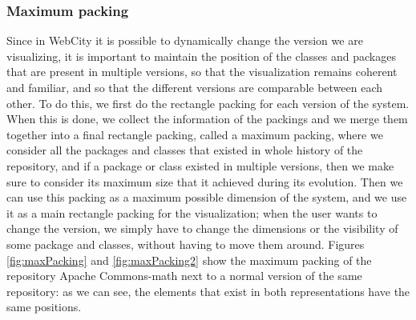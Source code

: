 \documentclass[]{usiinfbachelorproject}
\begin{document}
\subsubsection{Maximum packing} \label{Maximum packing}
Since in WebCity it is possible to dynamically change the version we are visualizing, it is important to maintain the position of the classes and packages that are present in multiple versions, so that the visualization remains coherent and familiar, and so that the different versions are comparable between each other.
To do this, we first do the rectangle packing for each version of the system. When this is done, we collect the information of the packings and we merge them together into a final rectangle packing, called a maximum packing, where we consider all the packages and classes that existed in whole history of the repository, and if a package or class existed in multiple versions, then we make sure to consider its maximum size that it achieved during its evolution.
Then we can use this packing as a maximum possible dimension of the system, and we use it as a main rectangle packing for the visualization; when the user wants to change the version, we simply have to change the dimensions or the visibility of some package and classes, without having to move them around.
Figures \ref{fig:maxPacking} and \ref{fig:maxPacking2} show the maximum packing of the repository Apache Commons-math next to a normal version of the same repository: as we can see, the elements that exist in both representations have the same positions.
\end{document}

